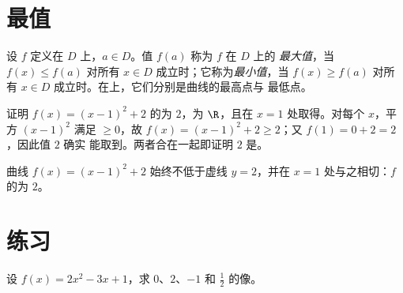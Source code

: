 \section{最值}

\begin{definition}\label{def:g10:functions:extrema}
设 $f$ 定义在 $D$ 上，$a \in D$。值 $f(a)$ 称为 $f$ 在 $D$ 上的
\emph{最大值}，当 $f(x) \leq f(a)$ 对所有
$x \in D$ 成立时；它称为\emph{最小值}，当
$f(x) \geq f(a)$ 对所有 $x \in D$ 成立时。在上，它们分别是曲线的最高点与
最低点。
\end{definition}

\begin{example}\label{ex:g10:functions:extremum}
证明 $f(x) = (x - 1)^2 + 2$ 的为 $2$，为 $\R$，且在
$x = 1$ 处取得。对每个 $x$，平方 $(x-1)^2$ 满足 $\geq 0$，故
$f(x) = (x-1)^2 + 2 \geq 2$；又 $f(1) = 0 + 2 = 2$，因此值 $2$ 确实
能取到。两者合在一起即证明 $2$ 是。
\end{example}

\begin{omfigure}

{\small 曲线 $f(x) = (x-1)^2 + 2$ 始终不低于虚线
$y = 2$，并在 $x = 1$ 处与之相切：$f$ 的为 $2$。}
\end{omfigure}

\section{练习}

\begin{exercise}[$\star$]\label{exo:g10:functions:1}
设 $f(x) = 2x^2 - 3x + 1$，求 $0$、$2$、$-1$ 和
$\frac12$ 的像。
\end{exercise}

